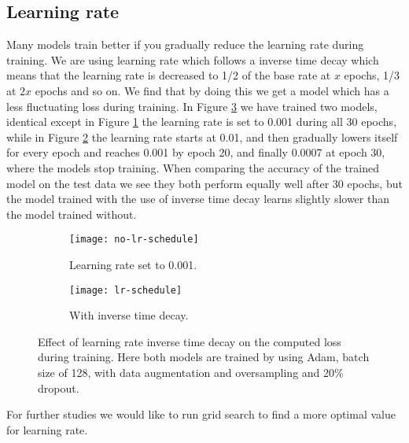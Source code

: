 \documentclass[thesis.tex]{subfiles}
\begin{document}
\subsection{Learning rate}
Many models train better if you gradually reduce the learning rate during training. We are using learning rate which follows a inverse time decay which means that the learning rate is decreased to 1/2 of the base rate at $x$ epochs, 1/3 at $2x$ epochs and so on. We find that by doing this we get a model which has a less fluctuating loss during training. In Figure \ref{fig:lr_decay} we have trained two models, identical except in Figure \ref{fig:no-lr-schedule} the learning rate is set to 0.001 during all 30 epochs, while in Figure \ref{fig:lr-schedule} the learning rate starts at 0.01, and then gradually lowers itself for every epoch and reaches 0.001 by epoch 20, and finally 0.0007 at epoch 30, where the models stop training. When comparing the accuracy of the trained model on the test data we see they both perform equally well after 30 epochs, but the model trained with the use of inverse time decay learns slightly slower than the model trained without.

\begin{figure}[h] %
  \centering
  \begin{subfigure}[b]{0.4\linewidth}
    \centering
    \texttt{[image: no-lr-schedule]}
    \caption{Learning rate set to 0.001.}
    \label{fig:no-lr-schedule}
  \end{subfigure}
  \begin{subfigure}[b]{0.4\linewidth}
    \centering
    \texttt{[image: lr-schedule]}
    \caption{With inverse time decay.}
    \label{fig:lr-schedule}
  \end{subfigure}
  \caption[Effect of inverse time decay on training and validation loss.]{Effect of learning rate inverse time decay on the computed loss during training. Here both models are trained by using Adam, batch size of 128, with data augmentation and oversampling and 20\% dropout.}
  \label{fig:lr_decay}
\end{figure}

For further studies we would like to run grid search to find a more optimal value for learning rate.
\end{document}
